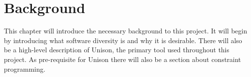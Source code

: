 \chapter{Background}

This chapter will introduce the necessary background to this project. It will begin by
introducing what software diversity is and why it is desirable. There will also be
a high-level description of Unison, the primary tool used throughout this project. As
pre-requisite for Unison there will also be a section about constraint programming.






